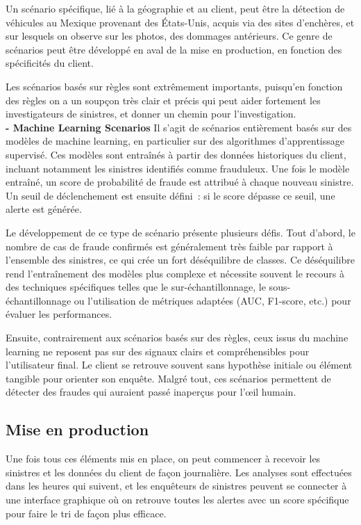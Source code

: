 \documentclass [twoside,openright,a4paper,11pt,french] {report}
\begin{document}
Un scénario spécifique, lié à la géographie et au client, peut être la détection de véhicules au Mexique provenant des États-Unis,  
acquis via des sites d'enchères, et sur lesquels on observe sur les photos, des dommages antérieurs.  
Ce genre de scénarios peut être développé en aval de la mise en production, en fonction des spécificités du client. 

Les scénarios basés sur règles sont extrêmement importants, puisqu'en fonction des règles on a un soupçon très clair et précis 
qui peut aider fortement les investigateurs de sinistres, et donner un chemin pour l'investigation. \\


\textbf{- Machine Learning Scenarios}
Il s'agit de scénarios entièrement basés sur des modèles de machine learning, en particulier sur des algorithmes d'apprentissage supervisé.  
Ces modèles sont entraînés à partir des données historiques du client, incluant notamment les sinistres identifiés comme frauduleux.  
Une fois le modèle entraîné, un score de probabilité de fraude est attribué à chaque nouveau sinistre.  
Un seuil de déclenchement est ensuite défini~: si le score dépasse ce seuil, une alerte est générée.

Le développement de ce type de scénario présente plusieurs défis.  
Tout d'abord, le nombre de cas de fraude confirmés est généralement très faible par rapport à l'ensemble des sinistres,  
ce qui crée un fort déséquilibre de classes. Ce déséquilibre rend l'entraînement des modèles plus complexe et nécessite souvent  
le recours à des techniques spécifiques telles que le sur-échantillonnage, le sous-échantillonnage ou l'utilisation de métriques adaptées  
(AUC, F1-score, etc.) pour évaluer les performances.

Ensuite, contrairement aux scénarios basés sur des règles, ceux issus du machine learning ne reposent pas sur des signaux clairs et compréhensibles pour l'utilisateur final.  
Le client se retrouve souvent sans hypothèse initiale ou élément tangible pour orienter son enquête.  
Malgré tout, ces scénarios permettent de détecter des fraudes qui auraient passé inaperçus pour l'œil humain. 




\subsection{Mise en production}

Une fois tous ces éléments mis en place, on peut commencer à recevoir les sinistres et les données du client de façon 
journalière. Les analyses sont effectuées dans les heures qui suivent, et les enquêteurs de sinistres peuvent se connecter 
à une interface graphique où on retrouve toutes les alertes avec un score spécifique pour faire le tri de façon plus efficace. 
\end{document}
